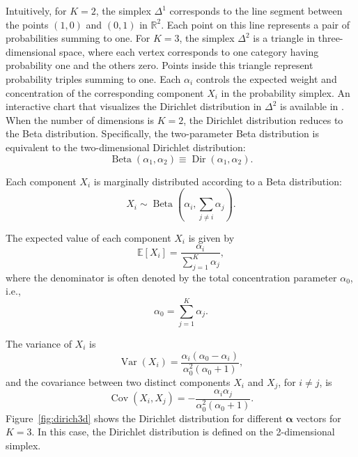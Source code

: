 \documentclass[12pt,a4paper]{article}
\begin{document}
	Intuitively, for \(K=2\), the simplex \(\Delta^1\) corresponds to the line segment between the points \((1,0)\) and \((0,1)\) in $\mathbb{R}^2$. Each point on this line represents a pair of probabilities summing to one. For \(K=3\), the simplex \(\Delta^2\) is a triangle in three-dimensional space, where each vertex corresponds to one category having probability one and the others zero. Points inside this triangle represent probability triples summing to one. 
	Each \( \alpha_i \) controls the expected weight and concentration of the corresponding component \( X_i \) in the probability simplex.
	An interactive chart that visualizes the Dirichlet distribution in \(\Delta^2\) is available in \cite{dirichlet_plot}. 	 
	When the number of dimensions is \( K = 2 \), the Dirichlet distribution reduces to the Beta distribution. Specifically, the two-parameter Beta distribution is equivalent to the two-dimensional Dirichlet distribution:
	\begin{equation}
	\operatorname{Beta}(\alpha_1, \alpha_2) \equiv \operatorname{Dir}(\alpha_1, \alpha_2).
	\label{eq:beta-dirichlet}
	\end{equation}


	Each component \( X_i \) is marginally distributed according to a Beta distribution:
	\begin{equation}
		X_i \sim \operatorname{Beta}\left( \alpha_i, \sum_{j \ne i} \alpha_j \right).
		\label{eq:dirichlet-marginal}
	\end{equation}

	The expected value of each component \( X_i \) is given by
	\begin{equation}
		\mathbb{E}[X_i] = \frac{\alpha_i}{\sum_{j=1}^K \alpha_j},
		\label{eq:dirichlet-mean}
	\end{equation}
	where the denominator is often denoted by the total concentration parameter \( \alpha_0 \), i.e.,
	\begin{equation}
		\alpha_0 = \sum_{j=1}^K \alpha_j.
		\label{eq:alpha0}
	\end{equation}

	The variance of \( X_i \) is
	\begin{equation}
	\operatorname{Var}(X_i) = \frac{\alpha_i (\alpha_0 - \alpha_i)}{\alpha_0^2 (\alpha_0 + 1)},
	\label{eq:dirichlet-var}
	\end{equation}
	and the covariance between two distinct components \( X_i \) and \( X_j \), for \( i \ne j \), is
	\begin{equation}
		\operatorname{Cov}(X_i, X_j) = -\frac{\alpha_i \alpha_j}{\alpha_0^2 (\alpha_0 + 1)}.
		\label{eq:dirichlet-cov}
	\end{equation}
	Figure~\ref{fig:dirich3d} shows the Dirichlet distribution for different \( \boldsymbol{\alpha} \) vectors for \( K = 3 \). In this case, the Dirichlet distribution is defined on the 2-dimensional simplex.
	
\end{document}
